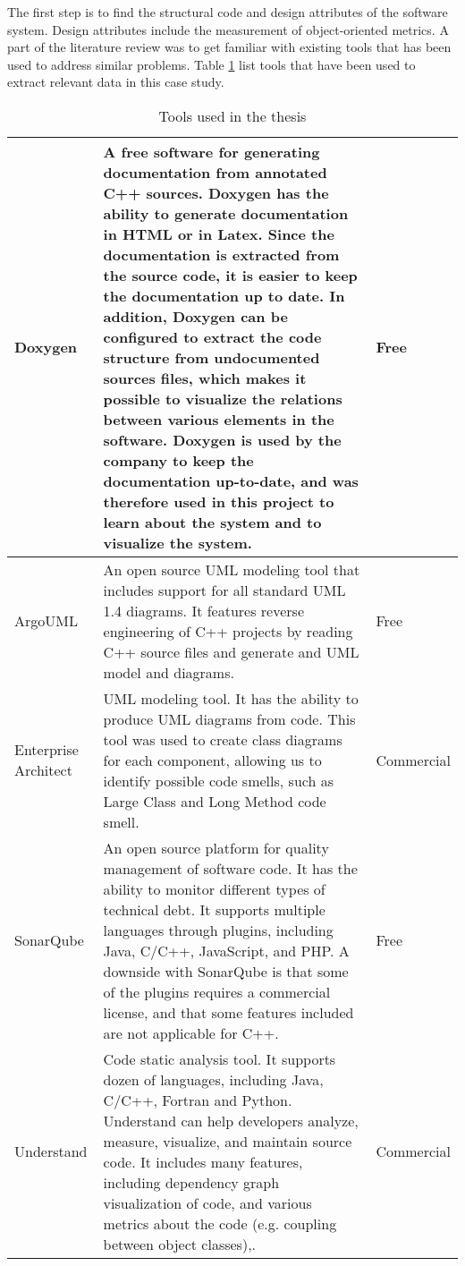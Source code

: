 The first step is to find the structural code and design attributes of the software system. Design attributes include the measurement of object-oriented metrics. A part of the literature review was to get familiar with existing tools that has been used to address similar problems. Table \ref{tab:tools} list tools that have been used to extract relevant data in this case study. 

\begin{table}[ht!]
	\centering
	\caption{Tools used in the thesis}
	\label{tab:tools}
	\begin{tabular}{|l|p{5cm}|l}
		\hline
		Doxygen & A free software for generating documentation from annotated C++ sources. Doxygen has the ability to generate documentation in HTML or in Latex. Since the documentation is extracted from the source code, it is easier to keep the documentation up to date. In addition, Doxygen can be configured to extract the code structure from undocumented sources files, which makes it possible to visualize the relations between various elements in the software. Doxygen is used by the company to keep the documentation up-to-date, and was therefore used in this project to learn about the system and to visualize the system. & Free \\ \hline

		ArgoUML\cite{argouml} & An open source UML modeling tool that includes support for all standard UML 1.4 diagrams. It features reverse engineering of C++ projects by reading C++ source files and generate and UML model and diagrams. & Free \\ \hline

		Enterprise Architect & UML modeling tool. It has the ability to produce UML diagrams from code. This tool was used to create class diagrams for each component, allowing us to identify possible code smells, such as Large Class and Long Method code smell. & Commercial \\ \hline

		SonarQube & An open source platform for quality management of software code. It has the ability to monitor different types of technical debt. It supports multiple languages through plugins, including Java, C/C++, JavaScript, and PHP. A downside with SonarQube is that some of the plugins requires a commercial license, and that some features included are not applicable for C++. & Free \\ \hline

		Understand & Code static analysis tool. It supports dozen of languages, including Java, C/C++, Fortran and Python. Understand can help developers analyze, measure, visualize, and maintain source code. It includes many features, including dependency graph visualization of code, and various metrics about the code (e.g. coupling between object classes),. & Commercial \\ \hline


\end{tabular}
\end{table}
